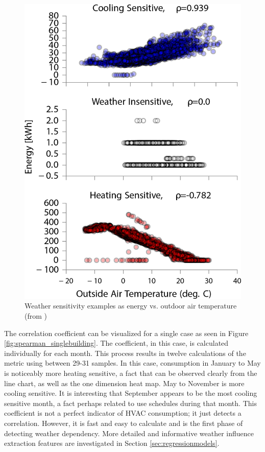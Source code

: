 \begin{figure}[ht!]
\begin{center}
\includegraphics[width=0.5599999999999999\columnwidth]{figures/weathersensitivity/weathersensitivity}
\caption{Weather sensitivity examples as energy vs. outdoor air temperature (from \citep{miller_forensically_2015})
\label{fig:weather_examples_plot}%
}
\end{center}
\end{figure}

The correlation coefficient can be visualized for a single case as seen in Figure \ref{fig:spearman_singlebuilding}. The coefficient, in this case, is calculated individually for each month. This process results in twelve calculations of the metric using between 29-31 samples. In this case, consumption in January to May is noticeably more heating sensitive, a fact that can be observed clearly from the line chart, as well as the one dimension heat map. May to November is more cooling sensitive. It is interesting that September appears to be the most cooling sensitive month, a fact perhaps related to use schedules during that month. This coefficient is not a perfect indicator of HVAC consumption; it just detects a correlation. However, it is fast and easy to calculate and is the first phase of detecting weather dependency. More detailed and informative weather influence extraction features are investigated in Section \ref{sec:regressionmodels}.

